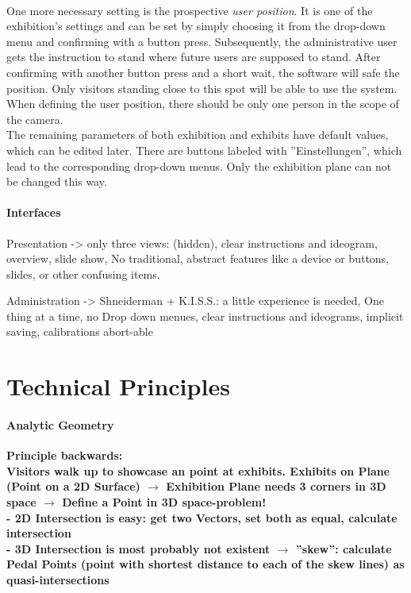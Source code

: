 \\
One more necessary setting is the prospective \textit{user position}. It is one of the exhibition's settings and can be set by simply choosing it from the drop-down menu and confirming with a button press. Subsequently, the administrative user gets the instruction to stand where future users are supposed to stand. After confirming with another button press and a short wait, the software will safe the position. Only visitors standing close to this spot will be able to use the system. When defining the user position, there should be only one person in the scope of the camera.  
\\
The remaining parameters of both exhibition and exhibits have default values, which can be edited later. There are buttons labeled with ''Einstellungen'', which lead to the corresponding drop-down menus. Only the exhibition plane can not be changed this way.

\paragraph{Interfaces} 

Presentation -> only three views: (hidden), clear instructions and ideogram, overview, slide show, No traditional, abstract features like a device or buttons, slides, or other confusing items.

Administration -> Shneiderman + K.I.S.S.: a little experience is needed, One thing at a time, no Drop down menues, clear instructions and ideograms, implicit saving, calibrations abort-able

\section{Technical Principles}
\label{installation_tech}

\paragraph{Analytic Geometry} \textbf{Principle backwards:
\\
Visitors walk up to showcase an point at exhibits. Exhibits on Plane (Point on a 2D Surface) $\to$ Exhibition Plane needs 3 corners in 3D space $\to$ Define a Point in 3D space-problem!
\\
- 2D Intersection is easy: get two Vectors, set both as equal, calculate intersection
\\
- 3D Intersection is most probably not existent $\to$ ''skew'': calculate Pedal Points (point with shortest distance to each of the skew lines) as quasi-intersections}


